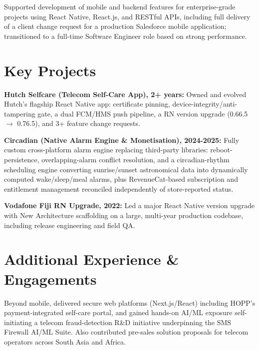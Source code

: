\documentclass[10.5pt]{article}
\begin{document}
\begin{cvitems}
  \item Supported development of mobile and backend features for enterprise-grade projects using React Native, React.js, and RESTful APIs, including full delivery of a client change request for a production Salesforce mobile application; transitioned to a full-time Software Engineer role based on strong performance.
\end{cvitems}

\section*{Key Projects}
\begin{cvitems}
  \item \textbf{Hutch Selfcare (Telecom Self-Care App), 2+ years:} Owned and evolved Hutch's flagship React Native app: certificate pinning, device-integrity/anti-tampering gate, a dual FCM/HMS push pipeline, a RN version upgrade (0.66.5 $\rightarrow$ 0.76.5), and 3+ feature change requests.
  \item \textbf{Circadian (Native Alarm Engine \& Monetisation), 2024-2025:} Fully custom cross-platform alarm engine replacing third-party libraries: reboot-persistence, overlapping-alarm conflict resolution, and a circadian-rhythm scheduling engine converting sunrise/sunset astronomical data into dynamically computed wake/sleep/meal alarms, plus RevenueCat-based subscription and entitlement management reconciled independently of store-reported status.
  \item \textbf{Vodafone Fiji RN Upgrade, 2022:} Led a major React Native version upgrade with New Architecture scaffolding on a large, multi-year production codebase, including release engineering and field QA.
\end{cvitems}

\section*{Additional Experience \& Engagements}
Beyond mobile, delivered secure web platforms (Next.js/React) including HOPP's payment-integrated self-care portal, and gained hands-on AI/ML exposure self-initiating a telecom fraud-detection R\&D initiative underpinning the SMS Firewall AI/ML Suite. Also contributed pre-sales solution proposals for telecom operators across South Asia and Africa.
\end{document}
